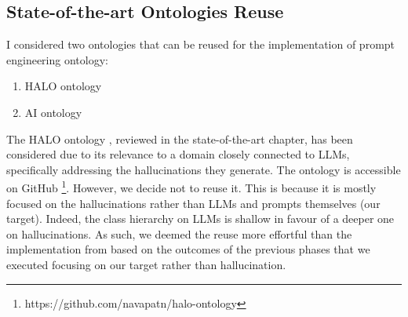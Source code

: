 \subsection{State-of-the-art Ontologies Reuse}
\label{subsection:4_2_2_reuse}

I considered two ontologies that can be reused for the implementation of prompt engineering ontology:
\begin{enumerate}
    \item HALO ontology

    \item AI ontology
\end{enumerate}


The HALO ontology \cite{nananukul2024halo}, reviewed in the state-of-the-art chapter, has been considered due to its relevance to a domain closely connected to LLMs, specifically addressing the hallucinations they generate.
The ontology is accessible on GitHub \footnote{https://github.com/navapatn/halo-ontology}.
However, we decide not to reuse it.
This is because it is mostly focused on the hallucinations rather than LLMs and prompts themselves (our target).
Indeed, the class hierarchy on LLMs is shallow in favour of a deeper one on hallucinations.
As such, we deemed the reuse more effortful than the implementation from based on the outcomes of the previous phases that we executed focusing on our target rather than hallucination.



